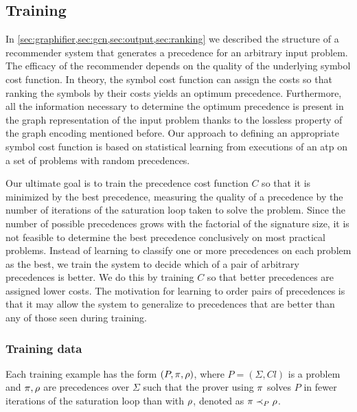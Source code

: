 \subsection{Training}
\label{sec:training}

In \cref{sec:graphifier,sec:gcn,sec:output,sec:ranking} we described the structure of a recommender system that generates a precedence for an arbitrary input problem.
The efficacy of the recommender depends on the quality of the underlying symbol cost function.
In theory, the symbol cost function can assign the costs so that
ranking the symbols by their costs yields an optimum precedence.
Furthermore, all the information necessary to determine the optimum precedence is present in the graph representation of the input problem
thanks to the lossless property of the graph encoding mentioned before.
Our approach to defining an appropriate symbol cost function is based on statistical learning
from executions of an \gls{atp} on a set of problems with random precedences.

Our ultimate goal is to train the precedence cost function $C$ so that it is minimized by the best precedence,
measuring the quality of a precedence by the number of iterations of the saturation loop taken to solve the problem.
Since the number of possible precedences grows with the factorial of the signature size,
it is not feasible to determine the best precedence conclusively on most practical problems.
Instead of learning to classify one or more precedences on each problem as the best,
we train the system to decide which of a pair of arbitrary precedences is better.
We do this by training $C$ so that better precedences are assigned lower costs.
The motivation for learning to order pairs of precedences
is that it may allow the system to generalize to precedences that are better than any of those seen during training.

\subsubsection{Training data}

Each training example has the form $(P, \pi, \rho)$,
where $P = (\Sigma, \mathit{Cl})$ is a problem
and $\pi, \rho$ are precedences over $\Sigma$
such that the prover using $\pi$ solves $P$ in fewer iterations of the saturation loop than with $\rho$,
denoted as $\pi \prec_{P} \rho$.

